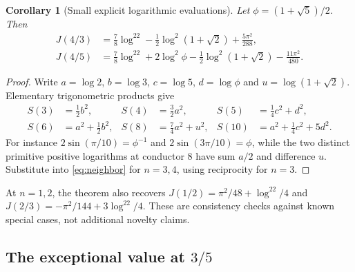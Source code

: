 \documentclass[11pt]{article}
\numberwithin{equation}{section}
\newtheorem{corollary}[theorem]{Corollary}
\theoremstyle{definition}
\theoremstyle{remark}
\begin{document}
\begin{corollary}[Small explicit logarithmic evaluations]\label{cor:small-J}
Let $\phi=(1+\sqrt5)/2$. Then
\begin{align}
 J(4/3)&=\frac78\log^22-\frac12\log^2(1+\sqrt2)
                     +\frac{5\pi^2}{288},\label{eq:J43}\\
 J(4/5)&=\frac78\log^22+2\log^2\phi
              -\frac12\log^2(1+\sqrt2)-\frac{11\pi^2}{480}.
 \label{eq:J45}
\end{align}
\end{corollary}
\begin{proof}
Write $a=\log2$, $b=\log3$, $c=\log5$, $d=\log\phi$ and
$u=\log(1+\sqrt2)$. Elementary trigonometric products give
\begin{align*}
 S(3)&=\tfrac12b^2,&S(4)&=\tfrac32a^2,&
 S(5)&=\tfrac14c^2+d^2,\\
 S(6)&=a^2+\tfrac12b^2,&S(8)&=\tfrac74a^2+u^2,&
 S(10)&=a^2+\tfrac14c^2+5d^2.
\end{align*}
For instance $2\sin(\pi/10)=\phi^{-1}$ and
$2\sin(3\pi/10)=\phi$, while the two distinct primitive positive
logarithms at conductor $8$ have sum $a/2$ and difference $u$.
Substitute into \eqref{eq:neighbor} for $n=3,4$, using reciprocity for
$n=3$.
\end{proof}

At $n=1,2$, the theorem also recovers
$J(1/2)=\pi^2/48+\log^22/4$ and
$J(2/3)=-\pi^2/144+3\log^22/4$. These are consistency checks against
known special cases, not additional novelty claims.

\subsection{The exceptional value at \texorpdfstring{$3/5$}{3/5}}
\end{document}
